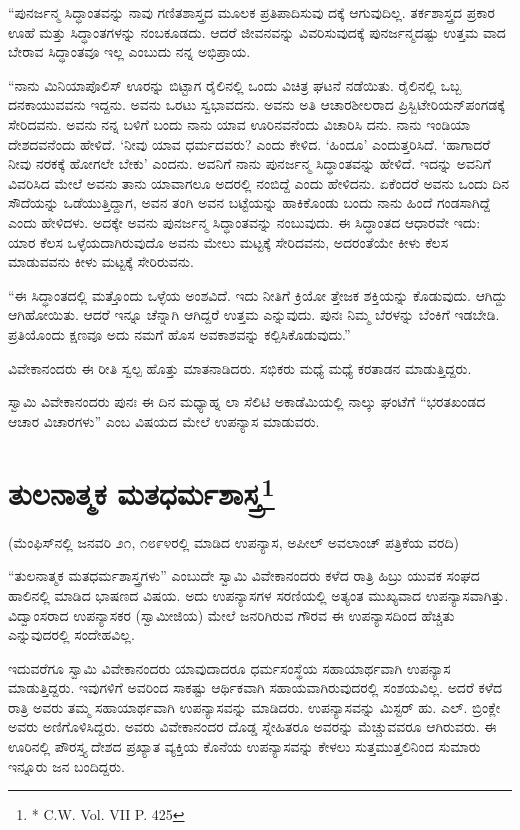 “ಪುನರ್ಜನ್ಮ ಸಿದ್ಧಾಂತವನ್ನು ನಾವು ಗಣಿತಶಾಸ್ತ್ರದ ಮೂಲಕ ಪ್ರತಿಪಾದಿಸುವು ದಕ್ಕೆ ಆಗುವುದಿಲ್ಲ. ತರ್ಕಶಾಸ್ತ್ರದ ಪ್ರಕಾರ ಊಹೆ ಮತ್ತು ಸಿದ್ಧಾಂತಗಳನ್ನು ನಂಬಕೂಡದು. ಆದರೆ ಜೀವನವನ್ನು ವಿವರಿಸುವುದಕ್ಕೆ ಪುನರ್ಜನ್ಮದಷ್ಟು ಉತ್ತಮ ವಾದ ಬೇರಾವ ಸಿದ್ಧಾಂತವೂ ಇಲ್ಲ ಎಂಬುದು ನನ್ನ ಅಭಿಪ್ರಾಯ.

“ನಾನು ಮಿನಿಯಾಪೊಲಿಸ್​ ಊರನ್ನು ಬಿಟ್ಟಾಗ ರೈಲಿನಲ್ಲಿ ಒಂದು ವಿಚಿತ್ರ ಘಟನೆ ನಡೆಯಿತು. ರೈಲಿನಲ್ಲಿ ಒಬ್ಬ ದನಕಾಯುವವನು ಇದ್ದನು. ಅವನು ಒರಟು ಸ್ವಭಾವದನು. ಅವನು ಅತಿ ಆಚಾರಶೀಲರಾದ ಪ್ರಿಸ್ಬಿಟೇರಿಯನ್​ ಪಂಗಡಕ್ಕೆ ಸೇರಿದವನು. ಅವನು ನನ್ನ ಬಳಿಗೆ ಬಂದು ನಾನು ಯಾವ ಊರಿನವನೆಂದು ವಿಚಾರಿಸಿ ದನು. ನಾನು ಇಂಡಿಯಾ ದೇಶದವನೆಂದು ಹೇಳಿದೆ. ‘ನೀವು ಯಾವ ಧರ್ಮದವರು? ಎಂದು ಕೇಳಿದ. ‘ಹಿಂದೂ’ ಎಂದುತ್ತರಿಸಿದೆ. ‘ಹಾಗಾದರೆ ನೀವು ನರಕಕ್ಕೆ ಹೋಗಲೇ ಬೇಕು’ ಎಂದನು. ಅವನಿಗೆ ನಾನು ಪುನರ್ಜನ್ಮ ಸಿದ್ಧಾಂತವನ್ನು ಹೇಳಿದೆ. ಇದನ್ನು ಅವನಿಗೆ ವಿವರಿಸಿದ ಮೇಲೆ ಅವನು ತಾನು ಯಾವಾಗಲೂ ಅದರಲ್ಲಿ ನಂಬಿದ್ದೆ ಎಂದು ಹೇಳಿದನು. ಏಕೆಂದರೆ ಅವನು ಒಂದು ದಿನ ಸೌದೆಯನ್ನು ಒಡೆಯುತ್ತಿದ್ದಾಗ, ಅವನ ತಂಗಿ ಅವನ ಬಟ್ಟೆಯನ್ನು ಹಾಕಿಕೊಂಡು ಬಂದು ನಾನು ಹಿಂದೆ ಗಂಡಸಾಗಿದ್ದೆ ಎಂದು ಹೇಳಿದಳು. ಅದಕ್ಕೇ ಅವನು ಪುನರ್ಜನ್ಮ ಸಿದ್ಧಾಂತವನ್ನು ನಂಬುವುದು. ಈ ಸಿದ್ಧಾಂತದ ಆಧಾರವೇ ಇದು: ಯಾರ ಕೆಲಸ ಒಳ್ಳೆಯದಾಗಿರುವುದೊ ಅವನು ಮೇಲು ಮಟ್ಟಕ್ಕೆ ಸೇರಿದವನು, ಅದರಂತೆಯೇ ಕೀಳು ಕೆಲಸ ಮಾಡುವವನು ಕೀಳು ಮಟ್ಟಕ್ಕೆ ಸೇರಿರುವನು.

“ಈ ಸಿದ್ಧಾಂತದಲ್ಲಿ ಮತ್ತೊಂದು ಒಳ್ಳೆಯ ಅಂಶವಿದೆ. ಇದು ನೀತಿಗೆ ಕ್ರಿಯೋ ತ್ತೇಜಕ ಶಕ್ತಿಯನ್ನು ಕೊಡುವುದು. ಆಗಿದ್ದು ಆಗಿಹೋಯಿತು. ಆದರೆ ಇನ್ನೂ ಚೆನ್ನಾಗಿ ಆಗಿದ್ದರೆ ಉತ್ತಮ ಎನ್ನುವುದು. ಪುನಃ ನಿಮ್ಮ ಬೆರಳನ್ನು ಬೆಂಕಿಗೆ ಇಡಬೇಡಿ. ಪ್ರತಿಯೊಂದು ಕ್ಷಣವೂ ಅದು ನಮಗೆ ಹೊಸ ಅವಕಾಶವನ್ನು ಕಲ್ಪಿಸಿಕೊಡುವುದು.”

ವಿವೇಕಾನಂದರು ಈ ರೀತಿ ಸ್ವಲ್ಪ ಹೊತ್ತು ಮಾತನಾಡಿದರು. ಸಭಿಕರು ಮಧ್ಯೆ ಮಧ್ಯೆ ಕರತಾಡನ ಮಾಡುತ್ತಿದ್ದರು.

ಸ್ವಾಮಿ ವಿವೇಕಾನಂದರು ಪುನಃ ಈ ದಿನ ಮಧ್ಯಾಹ್ನ ಲಾ ಸೆಲಿಟಿ ಅಕಾಡೆಮಿಯಲ್ಲಿ ನಾಲ್ಕು ಘಂಟೆಗೆ “ಭರತಖಂಡದ ಆಚಾರ ವಿಚಾರಗಳು” ಎಂಬ ವಿಷಯದ ಮೇಲೆ ಉಪನ್ಯಾಸ ಮಾಡುವರು.


\section[ತುಲನಾತ್ಮಕ ಮತಧರ್ಮಶಾಸ್ತ್ರ]{ತುಲನಾತ್ಮಕ ಮತಧರ್ಮಶಾಸ್ತ್ರ\protect\footnote{* C.W. Vol. VII P. 425}}

\begin{center}
(ಮೆಂಫಿಸ್​ನಲ್ಲಿ ಜನವರಿ ೨೧, ೧೮೯೪ರಲ್ಲಿ ಮಾಡಿದ ಉಪನ್ಯಾಸ, ಅಪೀಲ್​ ಅವಲಾಂಚ್​ ಪತ್ರಿಕೆಯ ವರದಿ)
\end{center}

“ತುಲನಾತ್ಮಕ ಮತಧರ್ಮಶಾಸ್ತ್ರಗಳು” ಎಂಬುದೇ ಸ್ವಾಮಿ ವಿವೇಕಾನಂದರು ಕಳೆದ ರಾತ್ರಿ ಹಿಬ್ರು ಯುವಕ ಸಂಘದ ಹಾಲಿನಲ್ಲಿ ಮಾಡಿದ ಭಾಷಣದ ವಿಷಯ. ಅದು ಉಪನ್ಯಾಸಗಳ ಸರಣಿಯಲ್ಲಿ ಅತ್ಯಂತ ಮುಖ್ಯವಾದ ಉಪನ್ಯಾಸವಾಗಿತ್ತು. ವಿದ್ವಾಂಸರಾದ ಉಪನ್ಯಾಸಕರ (ಸ್ವಾಮೀಜಿಯ) ಮೇಲೆ ಜನರಿಗಿರುವ ಗೌರವ ಈ ಉಪನ್ಯಾಸದಿಂದ ಹೆಚ್ಚಿತು ಎನ್ನುವುದರಲ್ಲಿ ಸಂದೇಹವಿಲ್ಲ.

ಇದುವರೆಗೂ ಸ್ವಾಮಿ ವಿವೇಕಾನಂದರು ಯಾವುದಾದರೂ ಧರ್ಮಸಂಸ್ಥೆಯ ಸಹಾಯಾರ್ಥವಾಗಿ ಉಪನ್ಯಾಸ ಮಾಡುತ್ತಿದ್ದರು. ಇವುಗಳಿಗೆ ಅವರಿಂದ ಸಾಕಷ್ಟು ಆರ್ಥಿಕವಾಗಿ ಸಹಾಯವಾಗಿರುವುದರಲ್ಲಿ ಸಂಶಯವಿಲ್ಲ. ಅದರೆ ಕಳೆದ ರಾತ್ರಿ ಅವರು ತಮ್ಮ ಸಹಾಯಾರ್ಥವಾಗಿ ಉಪನ್ಯಾಸವನ್ನು ಮಾಡಿದರು. ಉಪನ್ಯಾಸವನ್ನು ಮಿಸ್ಟರ್​ ಹು. ಎಲ್​. ಬ್ರಿಂಕ್ಲೇ ಅವರು ಅಣಿಗೊಳಿಸಿದ್ದರು. ಅವರು ವಿವೇಕಾನಂದರ ದೊಡ್ಡ ಸ್ನೇಹಿತರೂ ಅವರನ್ನು ಮೆಚ್ಚುವವರೂ ಆಗಿರುವರು. ಈ ಊರಿನಲ್ಲಿ ಪೌರಸ್ತ್ಯ ದೇಶದ ಪ್ರಖ್ಯಾತ ವ್ಯಕ್ತಿಯ ಕೊನೆಯ ಉಪನ್ಯಾಸವನ್ನು ಕೇಳಲು ಸುತ್ತಮುತ್ತಲಿನಿಂದ ಸುಮಾರು ಇನ್ನೂರು ಜನ ಬಂದಿದ್ದರು.

